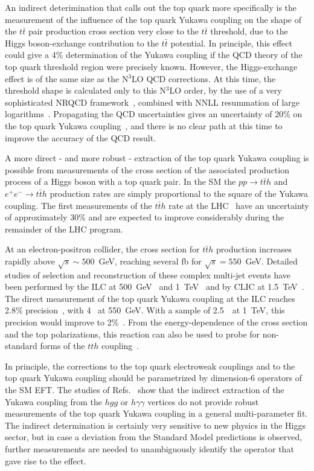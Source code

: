 An indirect deterimination that calls out the top quark more
specifically is the measurement of the influence of the top quark
Yukawa coupling on the shape of the  $t\bar{t}$ pair production 
cross section very close to the $t\bar{t}$ threshold, due to the Higgs
boson-exchange contribution to the $t\bar t$ potential. In principle,
this effect could give a 4\% determination of the Yukawa coupling if
the QCD  theory of the top quark threshold region were precisely
known.   However, the Higgs-exchange effect is of the same size as
the N$^3$LO QCD corrections.  At this time, the threshold shape is
calculated only to this N$^3$LO order, by the use of a very sophisticated
NRQCD framework~\cite{Beneke:2015kwa}, combined with NNLL resummation of
large logarithms~\cite{Hoang:2013uda}.   Propagating the QCD
uncertainties gives an uncertainty of 20\% on the top quark Yukawa
coupling~\cite{Vos:2016til}, and there is no clear path at this time to improve the
accuracy of the QCD result.

A more direct - and more robust - extraction of the top quark Yukawa coupling 
is possible from measurements of the cross section of the associated production 
process of a Higgs boson with a top quark pair. In the SM the $pp \rightarrow t\bar{t}h$ 
and $e^+e^- \rightarrow t\bar{t}h$ production rates are simply
proportional to the square of the Yukawa coupling. The first measurements of the 
$t\bar{t}h$ rate at the LHC~\cite{Sirunyan:2018hoz,Aaboud:2018urx} 
have an uncertainty of approximately 30\% and are expected to improve considerably 
during the remainder of the LHC program\cite{Cepeda:2019klc}.

At an electron-positron collider, the cross section for $t\bar{t}h$ production 
increases rapidly above $\sqrt{s} \sim 500 $~GeV, reaching several fb for 
$\sqrt{s} = 550$~GeV. Detailed studies of selection
 and reconstruction of these complex multi-jet events
have been performed by the ILC at 500~GeV~\cite{Yonamine:2011jg} and
 1~TeV~\cite{Behnke:2013lya,Price:2014oca} and by CLIC
at 1.5~TeV~\cite{Abramowicz:2018rjq}. The direct measurement of the
top quark Yukawa coupling at the ILC reaches 2.8\%
precision~\cite{Fujii:2015jha}, with 4~\iab{} at 550~GeV.  With a sample of
2.5~\iab\  at 1~TeV, this precision would improve to 2\%~\cite{Asner:2013psa}.  
From the energy-dependence of the cross section and the top polarizations,
this reaction can also be used to probe for non-standard forms of the
$tth$ coupling~\cite{Han:1999xd}.

In principle, the corrections to the top quark electroweak couplings
and to the top quark Yukawa coupling should be parametrized by
dimension-6 operators of the SM EFT. The studies of
Refs.~\cite{Azatov:2016xik,Durieux:2018ggn} 
show that the indirect extraction of the Yukawa coupling from the $hgg$ or
$ h \gamma \gamma$ vertices do not provide robust measurements of the
top quark Yukawa coupling in a general multi-parameter fit. The indirect determination 
is certainly very sensitive to new physics in the Higgs sector, but in case a 
deviation from the Standard Model predictions is observed, further measurements
are needed to unambiguously identify the operator that gave rise to 
the effect.  

